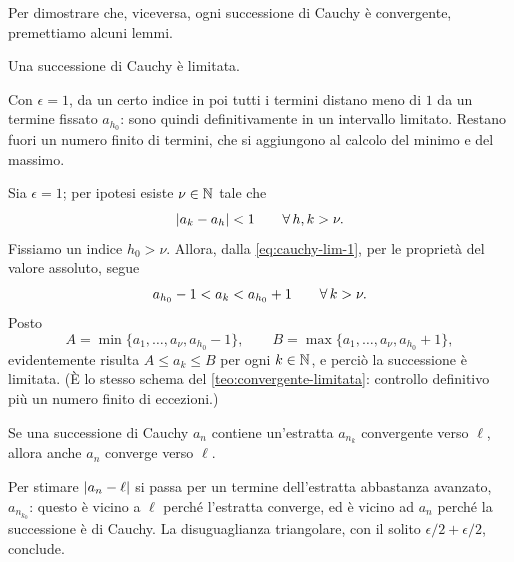 Per dimostrare che, viceversa, ogni successione di Cauchy è convergente, premettiamo alcuni
lemmi.

\begin{lemma}\label{lem:cauchy-limitata}
Una successione di Cauchy è limitata.
\end{lemma}

\begin{schema}
\end{schema}

\begin{strategia}
Con $\epsilon=1$, da un certo indice in poi tutti i termini distano meno di $1$ da un
termine fissato $a_{h_{0}}$: sono quindi definitivamente in un intervallo limitato.
Restano fuori un numero finito di termini, che si aggiungono al calcolo del minimo e del
massimo.
\end{strategia}

\begin{dimostrazione}
Sia $\epsilon=1$; per ipotesi esiste $\nu\in\mathbb{N}$ tale che
\begin{equation}\label{eq:cauchy-lim-1}
  \lvert a_{k}-a_{h}\rvert<1 \qquad\forall\, h,k>\nu .
\end{equation}
Fissiamo un indice $h_{0}>\nu$. Allora, dalla \eqref{eq:cauchy-lim-1}, per le proprietà
del valore assoluto, segue
\begin{equation}\label{eq:cauchy-lim-2}
  a_{h_{0}}-1<a_{k}<a_{h_{0}}+1 \qquad\forall\, k>\nu .
\end{equation}
Posto
\[
  A=\min\{a_{1},\dots,a_{\nu},a_{h_{0}}-1\}, \qquad B=\max\{a_{1},\dots,a_{\nu},a_{h_{0}}+1\},
\]
evidentemente risulta $A\le a_{k}\le B$ per ogni $k\in\mathbb{N}$, e perciò la successione è
limitata. (È lo stesso schema del \cref{teo:convergente-limitata}: controllo definitivo
più un numero finito di eccezioni.)
\end{dimostrazione}

\begin{lemma}\label{lem:cauchy-estratta}
Se una successione di Cauchy $a_{n}$ contiene un'estratta $a_{n_{k}}$ convergente verso
$\ell$, allora anche $a_{n}$ converge verso $\ell$.
\end{lemma}

\begin{schema}
\end{schema}

\begin{strategia}
Per stimare $\lvert a_{n}-\ell\rvert$ si passa per un termine dell'estratta abbastanza avanzato,
$a_{n_{k_{0}}}$: questo è vicino a $\ell$ perché l'estratta converge, ed è vicino ad
$a_{n}$ perché la successione è di Cauchy. La disuguaglianza triangolare, con il solito
$\epsilon/2+\epsilon/2$, conclude.
\end{strategia}


